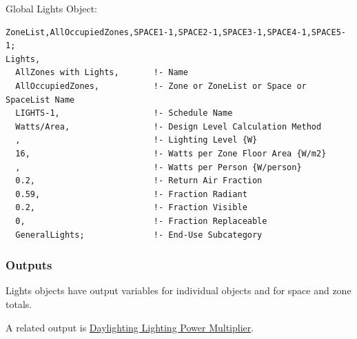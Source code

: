 Global Lights Object:

\begin{lstlisting}
ZoneList,AllOccupiedZones,SPACE1-1,SPACE2-1,SPACE3-1,SPACE4-1,SPACE5-1;
Lights,
  AllZones with Lights,       !- Name
  AllOccupiedZones,           !- Zone or ZoneList or Space or SpaceList Name
  LIGHTS-1,                   !- Schedule Name
  Watts/Area,                 !- Design Level Calculation Method
  ,                           !- Lighting Level {W}
  16,                         !- Watts per Zone Floor Area {W/m2}
  ,                           !- Watts per Person {W/person}
  0.2,                        !- Return Air Fraction
  0.59,                       !- Fraction Radiant
  0.2,                        !- Fraction Visible
  0,                          !- Fraction Replaceable
  GeneralLights;              !- End-Use Subcategory
\end{lstlisting}

\subsubsection{Outputs}\label{outputs-2-012}

Lights objects have output variables for individual objects and for space and zone totals.

A related output is \hyperref[daylighting-lighting-power-multiplier-1]{Daylighting Lighting Power Multiplier}.

